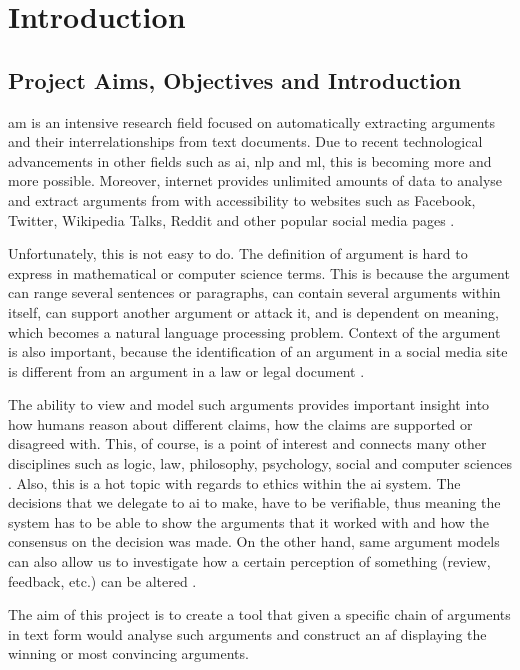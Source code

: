 \section{Introduction}
\subsection{Project Aims, Objectives and Introduction} 
 \gls{am} is an intensive research field focused on automatically extracting arguments and their interrelationships from text documents. Due to recent technological advancements in other fields such as \gls{ai}, \gls{nlp} and \gls{ml}, this is becoming more and more possible. Moreover, internet provides unlimited amounts of data to analyse and extract arguments from with accessibility to websites such as Facebook, Twitter, Wikipedia Talks, Reddit and other popular social media pages \citep{Lippi2016ArgumentationMS}. 
 
 Unfortunately, this is not easy to do. The definition of argument is hard to express in mathematical or computer science terms. This is because the argument can range several sentences or paragraphs, can contain several arguments within itself, can support another argument or attack it, and is dependent on meaning, which becomes a natural language processing problem. Context of the argument is also important, because the identification of an argument in a social media site is different from an argument in a law or legal document \citep{Cocarascu2017MiningBA}.

 The ability to view and model such arguments provides important insight into how humans reason about different claims, how the claims are supported or disagreed with. This, of course, is a point of interest and connects many other disciplines such as logic, law, philosophy, psychology, social and computer sciences \citep{Lippi2016ArgumentationMS}. Also, this is a hot topic with regards to ethics within the \gls{ai} system. The decisions that we delegate to \gls{ai} to make, have to be verifiable, thus meaning the system has to be able to show the arguments that it worked with and how the consensus on the decision was made. On the other hand, same argument models can also allow us to investigate how a certain perception of something (review, feedback, etc.) can be altered \citep{ApproxToTruth}.
 
 The aim of this project is to create a tool that given a specific chain of arguments in text form would analyse such arguments and construct an \gls{af} displaying the winning or most convincing arguments.
 

